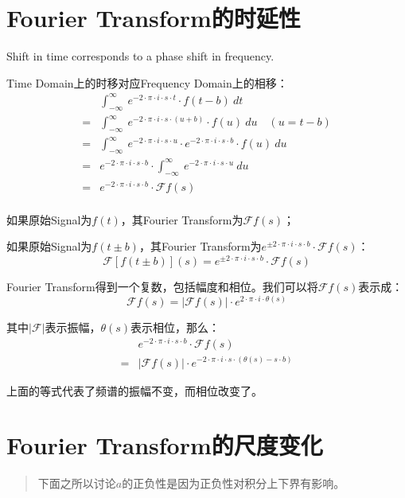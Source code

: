 \section{Fourier Transform的时延性}
Shift in time corresponds to a phase shift in frequency.

Time Domain上的时移对应Frequency Domain上的相移：
\begin{align*}
	  & \int_{-\infty}^{\infty}\ e^{-2\cdot \pi\cdot i\cdot s\cdot t}\cdot f(t-b)\ dt                                         \\
	= & \int_{-\infty}^{\infty}\ e^{-2\cdot \pi\cdot i\cdot s\cdot (u+b)}\cdot f(u)\ du\quad (u=t-b)                          \\
	= & \int_{-\infty}^{\infty}\ e^{-2\cdot \pi\cdot i\cdot s\cdot u}\cdot e^{-2\cdot \pi\cdot i\cdot s\cdot b}\cdot f(u)\ du \\
	= & e^{-2\cdot \pi\cdot i\cdot s\cdot b}\cdot \int_{-\infty}^{\infty}\ e^{-2\cdot \pi\cdot i\cdot s\cdot u}\ du           \\
	= & e^{-2\cdot \pi\cdot i\cdot s\cdot b}\cdot \mathcal{F}f(s)                                                             \\
\end{align*}


如果原始Signal为$f(t)$，其Fourier Transform为$\mathcal{F}f(s)$；

如果原始Signal为$f(t\pm b)$，其Fourier Transform为$e^{\pm 2\cdot \pi\cdot i\cdot s\cdot b}\cdot \mathcal{F}f(s)$：
\begin{equation}
	\mathcal{F}[f(t\pm b)](s)=e^{\pm 2\cdot \pi\cdot i\cdot s\cdot b}\cdot \mathcal{F}f(s)
\end{equation}

Fourier Transform得到一个复数，包括幅度和相位。我们可以将$\mathcal{F}f(s)$表示成：
$$
	\mathcal{F}f(s)=|\mathcal{F}f(s)|\cdot e^{2\cdot \pi\cdot i\cdot \theta(s)}
$$

其中$|\mathcal{F}|$表示振幅，$\theta(s)$表示相位，那么：
\begin{align*}
	  & e^{-2\cdot \pi\cdot i\cdot s\cdot b}\cdot \mathcal{F}f(s)                      \\
	= & |\mathcal{F}f(s)|\cdot e^{-2\cdot \pi\cdot i\cdot s\cdot (\theta(s)-s\cdot b)}
\end{align*}


上面的等式代表了频谱的振幅不变，而相位改变了。

\section{Fourier Transform的尺度变化}
\begin{quote}
	下面之所以讨论$a$的正负性是因为正负性对积分上下界有影响。
\end{quote}
